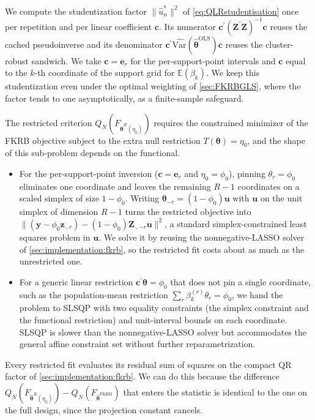 We compute the studentization factor $\|\hat{u}^*_n\|^2$ of \cref{eq:QLRstudentisation} once per repetition and per linear coefficient $\bm{c}$.
Its numerator $\bm{c}^\prime(\bm{Z}^\prime\bm{Z})^{-1}\bm{c}$ reuses the cached pseudoinverse and its denominator $\bm{c}^\prime\widehat{\mathrm{Var}}(\hat{\bm{\theta}}^{\mathrm{OLS}})\bm{c}$ reuses the cluster-robust sandwich.
We take $\bm{c} = \bm{e}_r$ for the per-support-point intervals and $\bm{c}$ equal to the $k$-th coordinate of the support grid for $\mathbb{E}(\beta_k)$.
We keep this studentization even under the optimal weighting of \cref{sec:FKRBGLS}, where the factor tends to one asymptotically, as a finite-sample safeguard.

The restricted criterion $Q_N(F_{\hat{\bm{\theta}}^R(\eta_0)})$ requires the constrained minimizer of the FKRB objective subject to the extra null restriction $T(\bm{\theta}) = \eta_0$, and the shape of this sub-problem depends on the functional.
\begin{itemize}
    \item For the per-support-point inversion ($\bm{c} = \bm{e}_r$ and $\eta_0 = \phi_0$), pinning $\theta_r = \phi_0$ eliminates one coordinate and leaves the remaining $R-1$ coordinates on a scaled simplex of size $1-\phi_0$.
    Writing $\bm{\theta}_{-r} = (1-\phi_0)\bm{u}$ with $\bm{u}$ on the unit simplex of dimension $R-1$ turns the restricted objective into $\|(\bm{y} - \phi_0 \bm{z}_{\cdot,r}) - (1-\phi_0)\bm{Z}_{\cdot,-r}\bm{u}\|^2$, a standard simplex-constrained least squares problem in $\bm{u}$.
    We solve it by reusing the nonnegative-LASSO solver of \cref{sec:implementation:fkrb}, so the restricted fit costs about as much as the unrestricted one.
    \item For a generic linear restriction $\bm{c}^\prime\bm{\theta} = \phi_0$ that does not pin a single coordinate, such as the population-mean restriction $\sum_{r}\beta_k^{(r)}\theta_r = \phi_0$, we hand the problem to SLSQP with two equality constraints (the simplex constraint and the functional restriction) and unit-interval bounds on each coordinate.
    SLSQP is slower than the nonnegative-LASSO solver but accommodates the general affine constraint set without further reparametrization.
\end{itemize}
Every restricted fit evaluates its residual sum of squares on the compact QR factor of \cref{sec:implementation:fkrb}.
We can do this because the difference $Q_N(F_{\hat{\bm{\theta}}^R(\eta_0)}) - Q_N(F_{\hat{\bm{\theta}}^{\mathrm{FKRB}}})$ that enters the statistic is identical to the one on the full design, since the projection constant cancels.

